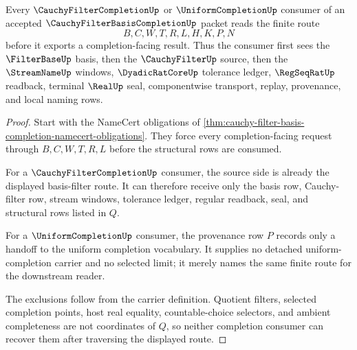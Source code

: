 \begin{theorem}
\label{thm:cauchy-filter-basis-completion-filterbase-route}
Every $\CauchyFilterCompletionUp$ or $\UniformCompletionUp$ consumer of an accepted $\CauchyFilterBasisCompletionUp$ packet reads the finite route
$$
B,C,W,T,R,L,H,K,P,N
$$
before it exports a completion-facing result. Thus the consumer first sees the $\FilterBaseUp$ basis, then the $\CauchyFilterUp$ source, then the $\StreamNameUp$ windows, $\DyadicRatCoreUp$ tolerance ledger, $\RegSeqRatUp$ readback, terminal $\RealUp$ seal, componentwise transport, replay, provenance, and local naming rows.
\end{theorem}
\begin{proof}
Start with the NameCert obligations of \autoref{thm:cauchy-filter-basis-completion-namecert-obligations}. They force every completion-facing request through $B,C,W,T,R,L$ before the structural rows are consumed.

For a $\CauchyFilterCompletionUp$ consumer, the source side is already the displayed basis-filter route. It can therefore receive only the basis row, Cauchy-filter row, stream windows, tolerance ledger, regular readback, seal, and structural rows listed in $Q$.

For a $\UniformCompletionUp$ consumer, the provenance row $P$ records only a handoff to the uniform completion vocabulary. It supplies no detached uniform-completion carrier and no selected limit; it merely names the same finite route for the downstream reader.

The exclusions follow from the carrier definition. Quotient filters, selected completion points, host real equality, countable-choice selectors, and ambient completeness are not coordinates of $Q$, so neither completion consumer can recover them after traversing the displayed route.
\end{proof}



